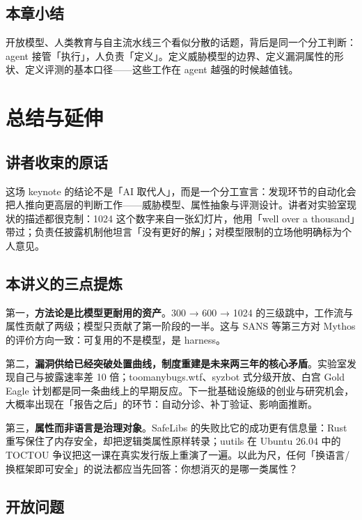\documentclass[a4paper,11pt]{article}
\begin{document}
\subsection{本章小结}

开放模型、人类教育与自主流水线三个看似分散的话题，背后是同一个分工判断：agent 接管「执行」，人负责「定义」。定义威胁模型的边界、定义漏洞属性的形状、定义评测的基本口径——这些工作在 agent 越强的时候越值钱。

\section{总结与延伸}

\subsection{讲者收束的原话}

这场 keynote 的结论不是「AI 取代人」，而是一个分工宣言：发现环节的自动化会把人推向更高层的判断工作——威胁模型、属性抽象与评测设计。讲者对实验室现状的描述都很克制：1024 这个数字来自一张幻灯片，他用「well over a thousand」带过；负责任披露机制他坦言「没有更好的解」；对模型限制的立场他明确标为个人意见。

\subsection{本讲义的三点提炼}

第一，\textbf{方法论是比模型更耐用的资产}。300 → 600 → 1024 的三级跳中，工作流与属性贡献了两级；模型只贡献了第一阶段的一半。这与 SANS 等第三方对 Mythos 的评价方向一致：可复用的不是模型，是 harness。

第二，\textbf{漏洞供给已经突破处置曲线，制度重建是未来两三年的核心矛盾}。实验室发现自己与披露速率差 10 倍；toomanybugs.wtf、syzbot 式分级开放、白宫 Gold Eagle 计划都是同一条曲线上的早期反应。下一批基础设施级的创业与研究机会，大概率出现在「报告之后」的环节：自动分诊、补丁验证、影响面推断。

第三，\textbf{属性而非语言是治理对象}。SafeLibs 的失败比它的成功更有信息量：Rust 重写保住了内存安全，却把逻辑类属性原样转录；uutils 在 Ubuntu 26.04 中的 TOCTOU 争议把这一课在真实发行版上重演了一遍。以此为尺，任何「换语言/换框架即可安全」的说法都应当先回答：你想消灭的是哪一类属性？

\subsection{开放问题}
\end{document}
